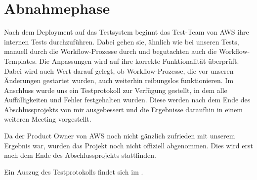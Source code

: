 \section{Abnahmephase}
\label{sec:Abnahmephase}

Nach dem Deployment auf das Testsystem beginnt das Test-Team von AWS ihre internen Tests durchzuführen.
Dabei gehen sie, ähnlich wie bei unseren Tests, manuell durch die Workflow-Prozesse durch und begutachten auch die Workflow-Templates.
Die Anpassungen wird auf ihre korrekte Funktionalität überprüft.
Dabei wird auch Wert darauf gelegt, ob Workflow-Prozesse, die vor unseren Änderungen gestartet wurden, auch weiterhin reibungslos funktionieren.
Im Anschluss wurde uns ein Testprotokoll zur Verfügung gestellt, in dem alle Auffälligkeiten und Fehler festgehalten wurden.
Diese werden nach dem Ende des Abschlussprojekts von mir ausgebessert und die Ergebnisse daraufhin in einem weiteren Meeting vorgestellt.

Da der Product Owner von AWS noch nicht gänzlich zufrieden mit unserem Ergebnis war, wurden das Projekt noch nicht offiziell abgenommen.
Dies wird erst nach dem Ende des Abschlussprojekts stattfinden.

Ein Auszug des Testprotokolls findet sich im .